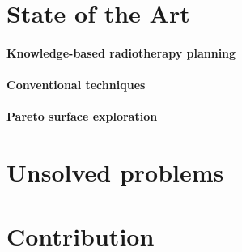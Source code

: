 \section{State of the Art}
\paragraph{Knowledge-based radiotherapy planning}

\paragraph{Conventional techniques}

\paragraph{Pareto surface exploration}

\section{Unsolved problems}

\section{Contribution}
